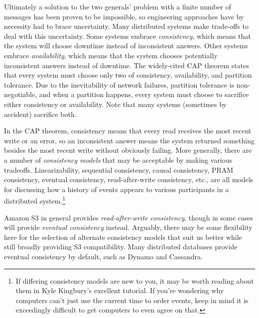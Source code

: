 \documentclass[a4paper,10pt]{article}
\begin{document}
Ultimately a solution to the two generals' problem with a finite number of
messages has been proven to be impossible, so engineering approaches have by
necessity had to brace uncertainty.
Many distributed systems make trade-offs to deal with this uncertainty. Some
systems embrace {\em consistency}, which means that the system will choose
downtime instead of inconsistent answers. Other systems embrace
{\em availability}, which means that the system chooses potentially inconsistent
answers instead of downtime. The widely-cited CAP theorem\cite{cap} states that
every system must choose only two of consistency, availability, and partition
tolerance. Due to the inevitability of network failures, partition tolerance
is non-negotiable, and when a partition happens, every system must choose
to sacrifice either consistency or availability. Note that many systems
(sometimes by accident) sacrifice both.

In the CAP theorem, consistency means that every read receives the most recent
write or an error, so an inconsistent answer means the system returned something
besides the most recent write without obviously failing. More generally, there
are a number of {\em consistency models} that may be acceptable by making
various tradeoffs. Linearizability, sequential consistency,
causal consistency, PRAM consistency, eventual consistency, read-after-write
consistency, etc., are all models for discussing how a history of events appears
to various participants in a distributed system.\footnote{If
differing consistency models are new to you, it may be worth reading about them
in Kyle Kingbury's excellent tutorial\cite{aphyr-consistency}.
If you're wondering why computers can't just use the current time to
order events, keep in mind it is exceedingly difficult to get computers to even
agree on that\cite{no-now}.}

Amazon S3 in general provides {\em read-after-write consistency}, though in
some cases will provide {\em eventual consistency} instead\cite{s3-consistency}.
Arguably, there may be some flexibility here for the selection of alternate
consistency models that suit us better while still broadly providing S3
compatibility. Many distributed databases provide eventual consistency by
default, such as Dynamo\cite{dynamo} and Cassandra\cite{cassandra}.
\end{document}
